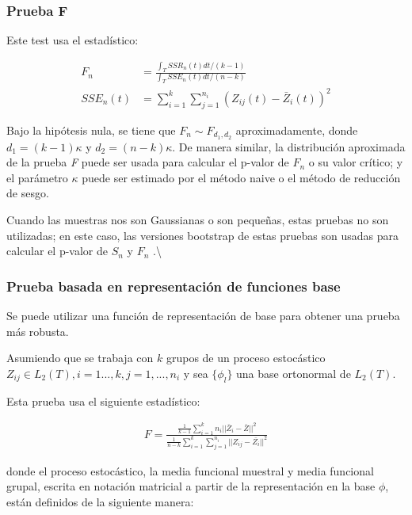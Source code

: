 \documentclass[
]{book}
\begin{document}
\hypertarget{prueba-f}{%
\subsubsection*{Prueba F}\label{prueba-f}}

Este test usa el estadístico:

\begin{align*}
    F_n&=\frac{\int_T SSR_n(t)dt/(k-1)}{\int_T SSE_n(t)dt/(n-k)}\\
    SSE_n(t)&=\sum_{i=1}^k\sum_{j=1}^{n_i}(Z_{ij}(t)-\bar{Z}_i(t))^2
\end{align*}

Bajo la hipótesis nula, se tiene que \(F_n \sim F_{d_1,d_2}\) aproximadamente, donde \(d_1=(k-1)\kappa\) y \(d_2=(n-k)\kappa\). De manera similar, la distribución aproximada de la prueba \textit{F} puede ser usada para calcular el p-valor de \(F_n\) o su valor crítico; y el parámetro \(\kappa\) puede ser estimado por el método naive o el método de reducción de sesgo.

Cuando las muestras nos son Gaussianas o son pequeñas, estas pruebas no son utilizadas; en este caso, las versiones bootstrap de estas pruebas son usadas para calcular el p-valor de \(S_n\) y \(F_n\) \citep{gorgi}.\textbackslash{}

\hypertarget{prueba-basada-en-representaciuxf3n-de-funciones-base}{%
\subsubsection*{Prueba basada en representación de funciones base}\label{prueba-basada-en-representaciuxf3n-de-funciones-base}}

Se puede utilizar una función de representación de base para obtener una prueba más robusta.

Asumiendo que se trabaja con \(k\) grupos de un proceso estocástico \(Z_{ij}\in L_2(T), i=1...,k,j=1,...,n_i\) y sea \(\{\phi_l\}\) una base ortonormal de \(L_2(T)\).

Esta prueba usa el siguiente estadístico:

\begin{align*}
    F=\frac{\frac{1}{k-1}\sum_{i=1}^k n_i||\bar{Z}_i-\bar{Z}||^2}{\frac{1}{n-k}\sum_{i=1}^k\sum_{j=1}^{n_i} ||Z_{ij}-\bar{Z_i}||^2}
\end{align*}

donde el proceso estocástico, la media funcional muestral y media funcional grupal, escrita en notación matricial a partir de la representación en la base \(\phi\), están definidos de la siguiente manera:
\end{document}
